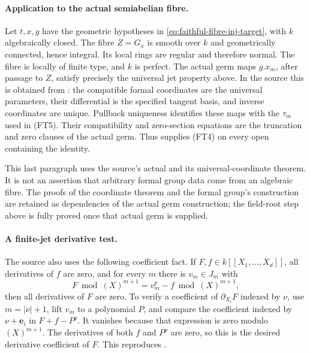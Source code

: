 \paragraph{Application to the actual semiabelian fibre.}
Let \(t,x,g\) have the geometric hypotheses in
\eqref{eq:faithful-fibre-inj-target}, with \(k\)
algebraically closed.
The fibre \(Z=G_x\) is smooth over \(k\) and geometrically
connected, hence integral.
Its local rings are regular and therefore normal.
The fibre is locally of finite type, and \(k\) is perfect.
The actual germ maps \(g.x_m\), after passage to \(Z\),
satisfy precisely the universal jet property above.
In the source this is obtained from
: the compatible formal coordinates
are the universal parameters, their differential is the
specified tangent basis, and inverse coordinates are unique.
Pullback uniqueness identifies these maps with the
\(\tau_m\) used in (FT5).
Their compatibility and zero-section equations are the
truncation and zero clauses of the actual germ.
Thus  supplies (FT4) on
every open containing the identity.

This last paragraph uses the source's actual
 and its universal-coordinate theorem.
It is not an assertion that arbitrary formal group data
come from an algebraic fibre.
The proofs of the coordinate theorem and the formal
group's construction are retained as dependencies of the
actual germ construction; the field-root step above is
fully proved once that actual germ is supplied.

\paragraph{A finite-jet derivative test.}
The source also uses the following coefficient fact.
If \(F,f\in k[[X_1,\ldots,X_d]]\), all derivatives of
\(f\) are zero, and for every \(m\) there is \(v_m\in J_m\)
with
\[
                           F\bmod(X)^{m+1}
                                  =v_m^p-f\bmod(X)^{m+1},
 \tag{FT6}\label{eq:faithful-jet-derivative-test}
\]
then all derivatives of \(F\) are zero.
To verify a coefficient of \(\partial_{X_i}F\) indexed
by \(\nu\), use \(m=|\nu|+1\), lift \(v_m\) to a polynomial
\(P\), and compare the coefficient indexed by
\(\nu+\mathbf e_i\) in \(F+f-P^p\).
It vanishes because that expression is zero modulo
\((X)^{m+1}\).
The derivatives of both \(f\) and \(P^p\) are zero,
so this is the desired derivative coefficient of \(F\).
This reproduces
.

